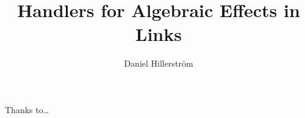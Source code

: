 \documentclass[msc,cs,twoside,openright,logo,rightchapter,normalheadings]{class/infthesis}
\title{Handlers for Algebraic Effects in Links}
\author{Daniel Hillerström}
\theoremstyle{definition}
\begin{document}
\raggedbottom
\begin{preliminary}

\maketitle

\begin{acknowledgements}
Thanks to\dots
\end{acknowledgements}

\standarddeclaration


\setcounter{tocdepth}{1}
\singlespace
\tableofcontents
\doublespace


\end{preliminary}




\singlespace
\printbibliography[heading=bibintoc]

\end{document}
